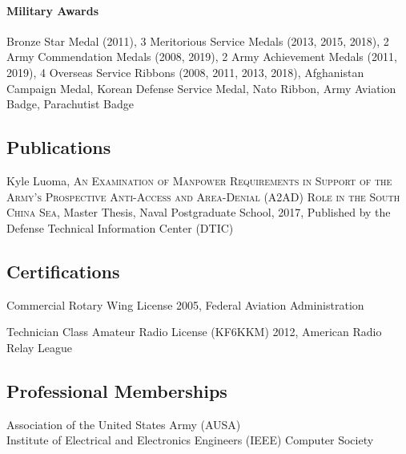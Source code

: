 \documentclass[12pt,letterpaper]{article}
\begin{document}
\paragraph{Military Awards}
Bronze Star Medal (2011),
3 Meritorious Service Medals (2013, 2015, 2018),
2 Army Commendation Medals (2008, 2019),
2 Army Achievement Medals (2011, 2019), 4 Overseas Service Ribbons (2008, 2011, 2013, 2018), Afghanistan Campaign Medal, Korean Defense Service Medal, Nato Ribbon, Army Aviation Badge, Parachutist Badge
\subsection{Publications}
Kyle Luoma, \textsc{An Examination of Manpower Requirements in Support of the Army's Prospective Anti-Access and Area-Denial (A2AD) Role in the South China Sea}, 
Master Thesis, Naval Postgraduate School, 2017, Published by the Defense Technical Information Center (DTIC)\par
\subsection{Certifications}
Commercial Rotary Wing License 2005, Federal Aviation Administration

Technician Class Amateur Radio License (KF6KKM) 2012, American Radio Relay League

\subsection{Professional Memberships}
Association of the United States Army (AUSA)\\
Institute of Electrical and Electronics Engineers (IEEE) Computer Society
\end{document}
